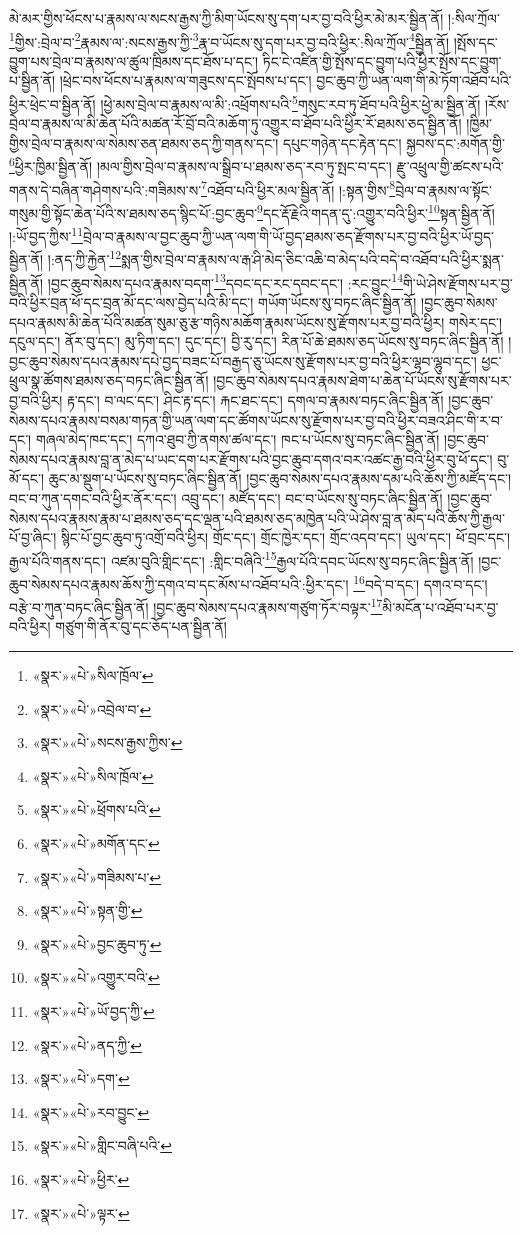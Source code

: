 མེ་མར་གྱིས་ཕོངས་པ་རྣམས་ལ་སངས་རྒྱས་ཀྱི་མིག་ཡོངས་སུ་དག་པར་བྱ་བའི་ཕྱིར་མེ་མར་སྦྱིན་ནོ། །:སིལ་ཀྲོལ་\footnote{«སྣར་»«པེ་»སིལ་ཁྲོལ་}གྱིས་:བྲེལ་བ་\footnote{«སྣར་»«པེ་»འབྲེལ་བ་}རྣམས་ལ་:སངས་རྒྱས་ཀྱི་\footnote{«སྣར་»«པེ་»སངས་རྒྱས་ཀྱིས་}རྣ་བ་ཡོངས་སུ་དག་པར་བྱ་བའི་ཕྱིར་:སིལ་ཀྲོལ་\footnote{«སྣར་»«པེ་»སིལ་ཁྲོལ་}སྦྱིན་ནོ། །སྤོས་དང་བྱུག་པས་བྲེལ་བ་རྣམས་ལ་ཚུལ་ཁྲིམས་དང་ཐོས་པ་དང་། ཏིང་ངེ་འཛིན་གྱི་སྤོས་དང་བྱུག་པའི་ཕྱིར་སྤོས་དང་བྱུག་པ་སྦྱིན་ནོ། །ཕྲེང་བས་ཕོངས་པ་རྣམས་ལ་གཟུངས་དང་སྤོབས་པ་དང་། བྱང་ཆུབ་ཀྱི་ཡན་ལག་གི་མེ་ཏོག་འཐོབ་པའི་ཕྱིར་ཕྲེང་བ་སྦྱིན་ནོ། །ཕྱེ་མས་བྲེལ་བ་རྣམས་ལ་མི་:འཕྲོགས་པའི་\footnote{«སྣར་»«པེ་»ཕྲོགས་པའི་}གསུང་རབ་ཏུ་ཐོབ་པའི་ཕྱིར་ཕྱེ་མ་སྦྱིན་ནོ། །རོས་བྲེལ་བ་རྣམས་ལ་མི་ཆེན་པོའི་མཚན་རོ་བྲོ་བའི་མཆོག་ཏུ་འགྱུར་བ་ཐོབ་པའི་ཕྱིར་རོ་ཐམས་ཅད་སྦྱིན་ནོ། །ཁྱིམ་གྱིས་བྲེལ་བ་རྣམས་ལ་སེམས་ཅན་ཐམས་ཅད་ཀྱི་གནས་དང་། དཔུང་གཉེན་དང་རྟེན་དང་། སྐྱབས་དང་:མགོན་གྱི་\footnote{«སྣར་»«པེ་»མགོན་དང་}ཕྱིར་ཁྱིམ་སྦྱིན་ནོ། །མལ་གྱིས་བྲེལ་བ་རྣམས་ལ་སྒྲིབ་པ་ཐམས་ཅད་རབ་ཏུ་སྤང་བ་དང་། རྫུ་འཕྲུལ་གྱི་ཚངས་པའི་གནས་དེ་བཞིན་གཤེགས་པའི་:གཟིམས་ས་\footnote{«སྣར་»«པེ་»གཟིམས་པ་}འཐོབ་པའི་ཕྱིར་མལ་སྦྱིན་ནོ། །:སྟན་གྱིས་\footnote{«སྣར་»«པེ་»སྟན་གྱི་}བྲེལ་བ་རྣམས་ལ་སྟོང་གསུམ་གྱི་སྟོང་ཆེན་པོའི་ས་ཐམས་ཅད་སྙིང་པོ་:བྱང་ཆུབ་\footnote{«སྣར་»«པེ་»བྱང་ཆུབ་ཏུ་}དང་རྡོ་རྗེའི་གདན་དུ་:འགྱུར་བའི་ཕྱིར་\footnote{«སྣར་»«པེ་»འགྱུར་བའི་}སྟན་སྦྱིན་ནོ། །:ཡོ་བྱད་ཀྱིས་\footnote{«སྣར་»«པེ་»ཡོ་བྱད་ཀྱི་}བྲེལ་བ་རྣམས་ལ་བྱང་ཆུབ་ཀྱི་ཡན་ལག་གི་ཡོ་བྱད་ཐམས་ཅད་རྫོགས་པར་བྱ་བའི་ཕྱིར་ཡོ་བྱད་སྦྱིན་ནོ། །:ནད་ཀྱི་རྐྱེན་\footnote{«སྣར་»«པེ་»ནད་ཀྱི་}སྨན་གྱིས་བྲེལ་བ་རྣམས་ལ་རྒ་ཤི་མེད་ཅིང་འཆི་བ་མེད་པའི་བདེ་བ་འཐོབ་པའི་ཕྱིར་སྨན་སྦྱིན་ནོ། །བྱང་ཆུབ་སེམས་དཔའ་རྣམས་བདག་\footnote{«སྣར་»«པེ་»དག་}དབང་དང་རང་དབང་དང་། :རང་བྱུང་\footnote{«སྣར་»«པེ་»རབ་བྱུང་}གི་ཡེ་ཤེས་རྫོགས་པར་བྱ་བའི་ཕྱིར་བྲན་ཕོ་དང་བྲན་མོ་དང་ལས་བྱེད་པའི་མི་དང་། གཡོག་ཡོངས་སུ་བཏང་ཞིང་སྦྱིན་ནོ། །བྱང་ཆུབ་སེམས་དཔའ་རྣམས་མི་ཆེན་པོའི་མཚན་སུམ་ཅུ་རྩ་གཉིས་མཆོག་རྣམས་ཡོངས་སུ་རྫོགས་པར་བྱ་བའི་ཕྱིར། གསེར་དང་། དངུལ་དང་། ནོར་བུ་དང་། མུ་ཏིག་དང་། དུང་དང་། བྱི་རུ་དང་། རིན་པོ་ཆེ་ཐམས་ཅད་ཡོངས་སུ་བཏང་ཞིང་སྦྱིན་ནོ། །བྱང་ཆུབ་སེམས་དཔའ་རྣམས་དཔེ་བྱད་བཟང་པོ་བརྒྱད་ཅུ་ཡོངས་སུ་རྫོགས་པར་བྱ་བའི་ཕྱིར་ལྷབ་ལྷུབ་དང་། ཕྱང་ཕྲུལ་སྣ་ཚོགས་ཐམས་ཅད་བཏང་ཞིང་སྦྱིན་ནོ། །བྱང་ཆུབ་སེམས་དཔའ་རྣམས་ཐེག་པ་ཆེན་པོ་ཡོངས་སུ་རྫོགས་པར་བྱ་བའི་ཕྱིར། རྟ་དང་། བ་ལང་དང་། ཤིང་རྟ་དང་། རྐང་ཐང་དང་། དགལ་བ་རྣམས་བཏང་ཞིང་སྦྱིན་ནོ། །བྱང་ཆུབ་སེམས་དཔའ་རྣམས་བསམ་གཏན་གྱི་ཡན་ལག་དང་ཚོགས་ཡོངས་སུ་རྫོགས་པར་བྱ་བའི་ཕྱིར་བཟའ་ཤིང་གི་ར་བ་དང་། གཞལ་མེད་ཁང་དང་། དཀའ་ཐུབ་ཀྱི་ནགས་ཚལ་དང་། ཁང་པ་ཡོངས་སུ་བཏང་ཞིང་སྦྱིན་ནོ། །བྱང་ཆུབ་སེམས་དཔའ་རྣམས་བླ་ན་མེད་པ་ཡང་དག་པར་རྫོགས་པའི་བྱང་ཆུབ་དགའ་བར་འཚང་རྒྱ་བའི་ཕྱིར་བུ་ཕོ་དང་། བུ་མོ་དང་། ཆུང་མ་སྡུག་པ་ཡོངས་སུ་བཏང་ཞིང་སྦྱིན་ནོ། །བྱང་ཆུབ་སེམས་དཔའ་རྣམས་དམ་པའི་ཆོས་ཀྱི་མཛོད་དང་། བང་བ་ཀུན་དགང་བའི་ཕྱིར་ནོར་དང་། འབྲུ་དང་། མཛོད་དང་། བང་བ་ཡོངས་སུ་བཏང་ཞིང་སྦྱིན་ནོ། །བྱང་ཆུབ་སེམས་དཔའ་རྣམས་རྣམ་པ་ཐམས་ཅད་དང་ལྡན་པའི་ཐམས་ཅད་མཁྱེན་པའི་ཡེ་ཤེས་བླ་ན་མེད་པའི་ཆོས་ཀྱི་རྒྱལ་པོ་བྱ་ཞིང་། སྙིང་པོ་བྱང་ཆུབ་ཏུ་འགྲོ་བའི་ཕྱིར། གྲོང་དང་། གྲོང་ཁྱེར་དང་། གྲོང་འདབ་དང་། ཡུལ་དང་། ཕོ་བྲང་དང་། རྒྱལ་པོའི་གནས་དང་། འཛམ་བུའི་གླིང་དང་། :གླིང་བཞིའི་\footnote{«སྣར་»«པེ་»གླིང་བཞི་པའི་}རྒྱལ་པོའི་དབང་ཡོངས་སུ་བཏང་ཞིང་སྦྱིན་ནོ། །བྱང་ཆུབ་སེམས་དཔའ་རྣམས་ཆོས་ཀྱི་དགའ་བ་དང་མོས་པ་འཐོབ་པའི་:ཕྱིར་དང་། \footnote{«སྣར་»«པེ་»ཕྱིར་}བདེ་བ་དང་། དགའ་བ་དང་། བརྩེ་བ་ཀུན་བཏང་ཞིང་སྦྱིན་ནོ། །བྱང་ཆུབ་སེམས་དཔའ་རྣམས་གཙུག་ཏོར་བལྟར་\footnote{«སྣར་»«པེ་»ལྟར་}མི་མངོན་པ་འཐོབ་པར་བྱ་བའི་ཕྱིར། གཙུག་གི་ནོར་བུ་དང་ཅོད་པན་སྦྱིན་ནོ། 